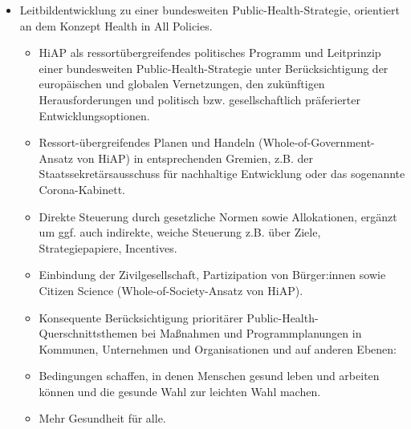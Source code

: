 \documentclass{article}
\begin{document}
\begin{itemize}
\item Leitbildentwicklung zu einer bundesweiten Public-Health-Strategie, orientiert an dem Konzept Health in All Policies.

\begin{itemize}
\item HiAP als ressortübergreifendes politisches Programm und Leitprinzip einer bundesweiten Public-Health-Strategie unter Berücksichtigung der europäischen und globalen Vernetzungen, den zukünftigen Herausforderungen und politisch bzw. gesellschaftlich präferierter Entwicklungsoptionen.


\end{itemize}
\begin{itemize}
\item Ressort-übergreifendes Planen und Handeln (Whole-of-Government-Ansatz von HiAP) in entsprechenden Gremien, z.B. der Staatssekretärsausschuss für nachhaltige Entwicklung oder das sogenannte Corona-Kabinett.


\end{itemize}
\begin{itemize}
\item Direkte Steuerung durch gesetzliche Normen sowie Allokationen, ergänzt um ggf. auch indirekte, weiche Steuerung z.B. über Ziele, Strategiepapiere, Incentives.


\end{itemize}
\begin{itemize}
\item Einbindung der Zivilgesellschaft, Partizipation von Bürger:innen sowie Citizen Science (Whole-of-Society-Ansatz von HiAP).


\end{itemize}
\begin{itemize}
\item Konsequente Berücksichtigung prioritärer Public-Health-Querschnittsthemen bei Maßnahmen und Programmplanungen in Kommunen, Unternehmen und Organisationen und auf anderen Ebenen:


\end{itemize}
\begin{itemize}
\item Bedingungen schaffen, in denen Menschen gesund leben und arbeiten können und die gesunde Wahl zur leichten Wahl machen. 


\end{itemize}
\begin{itemize}
\item Mehr Gesundheit für alle.



\end{itemize}
\end{itemize}
\end{document}
